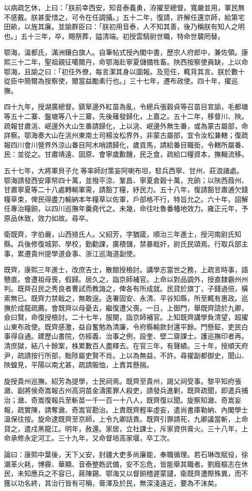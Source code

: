 \begin{pinyinscope}
以病疏乞休，上曰：「朕前幸西安，知音泰義勇，洊擢至總督。寬嚴並用，軍民無不感戴。朕甚愛惜之，可令在任調攝。」五十二年，復請，許解任還京師，給第宅田畝，以旌其廉。並諭群臣曰：「朕初用音泰，人不知其善，後乃稱朕有知人之明也。」五十三年，卒，賜祭葬，謚清端。初授雲騎尉世職，特命世襲罔替。

鄂海，溫都氏，滿洲鑲白旗人。自筆帖式授內閣中書，歷宗人府郎中，兼佐領。康熙三十二年，聖祖親征噶爾丹，命鄂海赴寧夏儲備牲畜。陜西按察使員缺，上以命鄂海，且諭之曰：「初任外僚，每言潔其身以圖報。及蒞任，輒背其言。朕於數十從臣中簡爾為按察使，爾當益勵素行也。」三十七年，遷布政使。四十年，擢巡撫。

四十九年，授湖廣總督。鎮筸邊外紅苗為亂，令總兵張穀貞等召苗目宣諭，毛都塘等五十二寨、盤塘等八十三寨，先後薙發歸化，上嘉之。五十二年，移督川、陜。疏報甘肅洮、岷邊外大山生番請歸化，上以洮、岷邊外無生番，或為蒙古屬部，命詳察。鄂海奏大山在洮州東南土司楊汝松界外，非蒙古屬部，宜令汝松兼轄；復疏報四川會川營界外涼山番目阿木哨請歸化，歲貢馬，請給番目職銜，令轄所屬番、民：並從之。甘肅靖遠、固原、會寧歲歉饑，民乏食，疏給口糧資本，撫輯流移。

五十七年，大將軍貝子允等率師討策妄阿喇布坦，駐兵西寧、甘州、莊浪諸處。鄂海請發西安庫帑四十萬，並撥平涼、鞏昌、寧夏倉穀十萬，充餉；以陜西葭州、甘肅寧夏等二十八處轉輸軍需，請豁丁糧，紓民力。五十八年，復請豁甘肅逋欠錢糧草束，俾民得盡力輸納本年糧草以佐軍，戶部格不行，特旨允之。六十年，詔解任專治糧餉，以四川巡撫年羹堯代之。未幾，命往吐魯番種地效力。雍正元年，予原品休致，效力如故。尋卒。

衛既齊，字伯嚴，山西猗氏人。父紹芳，字猶箴，順治三年進士，授河南尉氏知縣。兵後修復城郭、學校，勤勸課，廣積儲，禁暴戢奸，尉氏民頌焉。行取兵部主事，累遷貴州提學道僉事、浙江巡海道副使。

既齊，康熙三年進士，改庶吉士，散館授檢討。講學志當世之務，上疏言時事，語戇直。會遭祖母喪，假歸。居久之，詣京師補官。上命以對品調外，授直隸霸州州判。既齊召民之秀良者曹試而教誨之，俾各有所成就。民貸於旗丁，子錢過倍，橫索無已。既齊力禁戢之，無敢逞。迭署固安、永清、平谷知縣，所至輒有惠政。巡撫於成龍疏薦。會既齊以母憂去，繼復遭父喪。一日，上御門，舉既齊諮於九卿，僉曰賢，命復授檢討。二十七年，服闋，詣京師補官。上知既齊講學負清望，超擢山東布政使。既齊感激，益自奮勉為清廉，令府縣輸款封還平餘。門懸鉦，吏民白事得自通。建歷山書院，仿經義、治事之例，設奎、壁二齋課士。護巡撫印者再。清庶獄，結八十餘案，株累數百人盡釋去。在官三年，有聲績。三十年，授順天府尹，疏請按行所部，黜陟屬吏賢不肖。上以為無益，不許。尋擢副都御史，聞山、陜蝗見，平陽以南尤甚，疏請賑恤，上責其懸揣。

旋授貴州巡撫。紹芳為提學，士民祠焉。既齊至貴州，謁父祠受事。黎平知府張瀲、副將侯奇嵩報古州高洞苗金濤匿罪人殺吏，請發兵進剿，既齊疏聞，即遣兵捕治；瀲、奇嵩復報兵至斬苗一千一百一十八人，既齊復以聞。旋察知瀲、奇嵩妄報，疏實陳，請奪瀲、奇嵩官勘治。上責既齊輕率虛妄，遣尚書庫勒納、內閣學士溫保往按。旋命逮既齊至京師，上令九卿詰責。既齊引罪請死，九卿議當斬，上命貸之，遣戍黑龍江。明年，赦還。家居，立社課士，斥家資供膏火。三十八年，上命承修永定河工。三十九年，又命督培高家堰，卒工次。

論曰：康熙中葉後，天下乂安，封疆大吏多尚廉能，奉職循理。若石琳改賦役，徐潮革火耗，博霽、華顯、音泰整飭武備，安不忘危，皆能舉其職者。劉廕樞志在休民，未知應兵之不容已，蔣陳錫、鄂海又以督餉稽遲蒙譴，衛既齊遭際殊異，而不獲以功名終，其治行皆有可稱，膏澤及於民，無深淺遠近，要為不沫矣。


\end{pinyinscope}